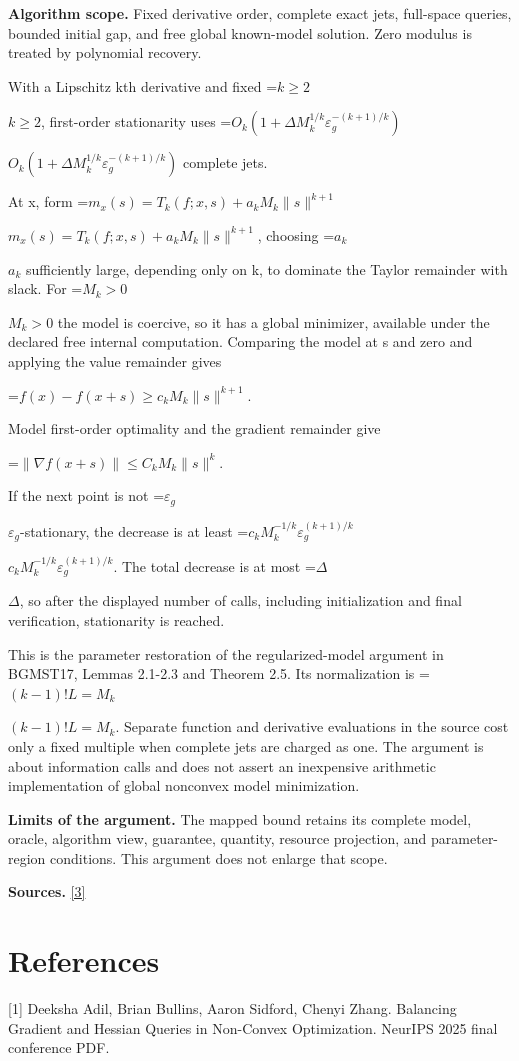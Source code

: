 \documentclass[10pt,a4paper]{article}
\newcommand{\AtlasMath}[1]{\par\begingroup\centering\setbox0=\hbox{$\displaystyle #1$}\ifdim\wd0>1.4\linewidth\typeout{ATLAS WIDE FORMULA: \the\wd0}\fi\ifdim\wd0>\linewidth\resizebox{\linewidth}{!}{\box0}\else\box0\fi\par\endgroup}
\newcommand{\AtlasInlineMath}[1]{\begingroup\setbox0=\hbox{$#1$}\ifdim\wd0>.4\linewidth\endgroup\AtlasMath{#1}\else\endgroup$#1$\fi}
\begin{document}
\textbf{Algorithm scope.} Fixed derivative order, complete exact jets, full-space queries, bounded initial gap, and free global known-model solution. Zero modulus is treated by polynomial recovery.

With a Lipschitz kth derivative and fixed \AtlasInlineMath{k\ge2}, first-order stationarity uses \AtlasInlineMath{O_k(1+\Delta M_k^{1/k}\varepsilon_g^{-(k+1)/k})} complete jets.

At x, form \AtlasInlineMath{m_x(s)=T_k(f;x,s)+a_kM_k\|s\|^{k+1}}, choosing \AtlasInlineMath{a_k} sufficiently large, depending only on k, to dominate the Taylor remainder with slack. For \AtlasInlineMath{M_k>0} the model is coercive, so it has a global minimizer, available under the declared free internal computation. Comparing the model at s and zero and applying the value remainder gives

\AtlasMath{f(x)-f(x+s)\ge c_kM_k\|s\|^{k+1}.}

Model first-order optimality and the gradient remainder give

\AtlasMath{\|\nabla f(x+s)\|\le C_kM_k\|s\|^k.}

If the next point is not \AtlasInlineMath{\varepsilon_g}-stationary, the decrease is at least \AtlasInlineMath{c_kM_k^{-1/k}\varepsilon_g^{(k+1)/k}}. The total decrease is at most \AtlasInlineMath{\Delta}, so after the displayed number of calls, including initialization and final verification, stationarity is reached.

This is the parameter restoration of the regularized-model argument in BGMST17, Lemmas 2.1-2.3 and Theorem 2.5. Its normalization is \AtlasInlineMath{(k-1)!L=M_k}. Separate function and derivative evaluations in the source cost only a fixed multiple when complete jets are charged as one. The argument is about information calls and does not assert an inexpensive arithmetic implementation of global nonconvex model minimization.

\textbf{Limits of the argument.} The mapped bound retains its complete model, oracle, algorithm view, guarantee, quantity, resource projection, and parameter-region conditions. This argument does not enlarge that scope.

\textbf{Sources.} \href{https://optimization-online.org/wp-content/uploads/2015/06/4970.pdf}{[3]}

\section{References}
[1] Deeksha Adil, Brian Bullins, Aaron Sidford, Chenyi Zhang. Balancing Gradient and Hessian Queries in Non-Convex Optimization. NeurIPS 2025 final conference PDF.
\end{document}
